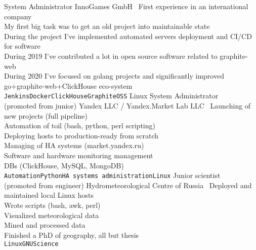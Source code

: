 \documentclass[11pt]{developercv} %
\begin{document}
\begin{entrylist}
    {System Administrator}
    {InnoGames GmbH}
    {\
      First experience in an international company\\
      My first big task was to get an old project into maintainable state\\
      During the project I've implemented automated servers deployment and CI/CD for software\\
      During 2019 I've contributed a lot in open source software related to graphite-web\\
      During 2020 I've focused on golang projects and significantly improved go+graphite-web+ClickHouse eco-system\\
      \texttt{Jenkins}\slashsep\texttt{Docker}\slashsep\texttt{ClickHouse}\slashsep\texttt{Graphite}\slashsep\texttt{OSS}
    }
    {Linux System Administrator\\(promoted from junior)}
    {Yandex LLC / Yandex.Market Lab LLC}
    {\
      Launching of new projects (full pipeline)\\
      Automation of toil (bash, python, perl scripting)\\
      Deploying hosts to production-ready from scratch\\
      Managing of HA systems (market.yandex.ru)\\
      Software and hardware monitoring management\\
      DBs (ClickHouse, MySQL, MongoDB)\\
      \texttt{Automation}\slashsep\texttt{Python}\slashsep\texttt{HA systems administration}\slashsep\texttt{Linux}
    }
  \entry{2009 --- 2013}
    {Junior scientist\\(promoted from engineer)}
    {Hydrometeorological Centre of Russia}
    {\
      Deployed and maintained local Linux hosts\\
      Wrote scripts (bash, awk, perl)\\
      Visualized meteorological data\\
      Mined and processed data\\
      Finished a PhD of geography, all but thesis\\
      \texttt{Linux}\slashsep\texttt{GNU}\slashsep\texttt{Science}
    }
\end{entrylist}

\end{document}
